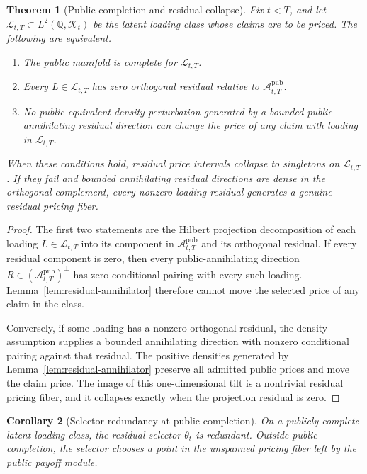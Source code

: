 \documentclass[11pt,a4paper]{amsart}
\theoremstyle{plain}
\newtheorem{theorem}{Theorem}[section]
\newtheorem{corollary}[theorem]{Corollary}
\theoremstyle{definition}
\theoremstyle{remark}
\newcommand{\QQ}{\mathbb{Q}}
\newcommand{\cA}{\mathcal{A}}
\newcommand{\cK}{\mathcal{K}}
\newcommand{\cL}{\mathcal{L}}
\begin{document}
\begin{theorem}[Public completion and residual collapse]\label{thm:public-completion}
Fix \(t<T\), and let \(\cL_{t,T}\subset L^2(\QQ,\cK_t)\) be the latent loading class whose
claims are to be priced.  The following are equivalent.
\begin{enumerate}[leftmargin=2em]
\item The public manifold is complete for \(\cL_{t,T}\).
\item Every \(L\in\cL_{t,T}\) has zero orthogonal residual relative to
\(\cA_{t,T}^{\mathrm{pub}}\).
\item No public-equivalent density perturbation generated by a bounded public-annihilating
residual direction can change the price of any claim with loading in \(\cL_{t,T}\).
\end{enumerate}
When these conditions hold, residual price intervals collapse to singletons on
\(\cL_{t,T}\).  If they fail and bounded annihilating residual directions are dense in the
orthogonal complement, every nonzero loading residual generates a genuine residual pricing fiber.
\end{theorem}

\begin{proof}
The first two statements are the Hilbert projection decomposition of each loading
\(L\in\cL_{t,T}\) into its component in \(\cA_{t,T}^{\mathrm{pub}}\) and its orthogonal
residual.  If every residual component is zero, then every public-annihilating direction
\(R\in(\cA_{t,T}^{\mathrm{pub}})^\perp\) has zero conditional pairing with every such loading.
Lemma~\ref{lem:residual-annihilator} therefore cannot move the selected price of any claim in the
class.

Conversely, if some loading has a nonzero orthogonal residual, the density assumption supplies a
bounded annihilating direction with nonzero conditional pairing against that residual.  The
positive densities generated by Lemma~\ref{lem:residual-annihilator} preserve all admitted public
prices and move the claim price.  The image of this one-dimensional tilt is a nontrivial residual
pricing fiber, and it collapses exactly when the projection residual is zero.
\end{proof}

\begin{corollary}[Selector redundancy at public completion]\label{cor:selector-redundancy}
On a publicly complete latent loading class, the residual selector \(\theta_t\) is redundant.
Outside public completion, the selector chooses a point in the unspanned pricing fiber left by the
public payoff module.
\end{corollary}
\end{document}
